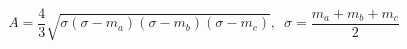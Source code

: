 \documentclass[12pt]{article}
\begin{document}
\[
    A = \frac{4}{3}\sqrt{\sigma(\sigma - m_a)(\sigma - m_b)(\sigma - m_c)}, \, \, \, \sigma = \frac{m_a + m_b + m_c}{2}
\]
\end{document}
